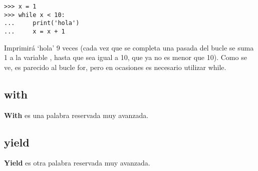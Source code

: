 \begin{listing}
\begin{verbatim}
>>> x = 1
>>> while x < 10:
...     print('hola')
...     x = x + 1
\end{verbatim}
\end{listing}

Imprimirá `hola' 9 veces (cada vez que se completa una pasada del bucle se suma 1 a la variable , hasta que  sea igual a 10, que ya no es menor que 10). Como se ve, es parecido al bucle for, pero en ocasiones es necesario utilizar while.

\subsection*{with}

\textbf{With} es una palabra reservada muy avanzada.

\subsection*{yield}
\textbf{Yield} es otra palabra reservada muy avanzada.

\newpage
